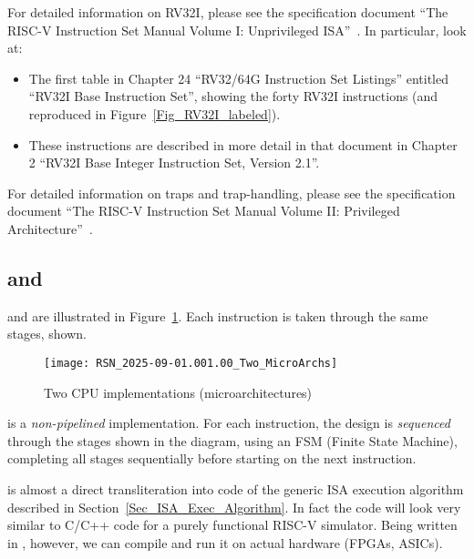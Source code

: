 For detailed information on RV32I, please see the specification
document ``The RISC-V Instruction Set Manual Volume I: Unprivileged
ISA''~\cite{RISCV_Unpriv_2019_12_13}.  In particular, look at:

\begin{itemize}

 \item The first table in Chapter 24 ``RV32/64G Instruction Set
       Listings'' entitled ``RV32I Base Instruction Set'', showing the
       forty RV32I instructions (and reproduced in
       Figure~\ref{Fig_RV32I_labeled}).

 \item These instructions are described in more detail in that
       document in Chapter 2 ``RV32I Base Integer Instruction Set,
       Version 2.1''.

\end{itemize}

For detailed information on traps and trap-handling, please see the
specification document ``The RISC-V Instruction Set Manual Volume II:
Privileged Architecture''~\cite{RISCV_Priv_2021_12_03}.


\subsection{{\DRUM} and {\FIFE}}

{\DRUM} and {\FIFE} are illustrated in
Figure~\ref{Fig_Two_Microarchitectures}.  Each instruction is taken
through the same stages, shown.
\begin{figure}[htbp]
  \centerline{\texttt{[image: RSN\_2025-09-01.001.00\_Two\_MicroArchs]}}
  \caption{\label{Fig_Two_Microarchitectures}Two CPU implementations (microarchitectures)}
\end{figure}

{\DRUM} is a \emph{non-pipelined} implementation.  For each instruction,
the design is \emph{sequenced} through the stages shown in the
diagram, using an FSM (Finite State Machine), completing all stages
sequentially before starting on the next instruction.

{\DRUM} is almost a direct transliteration into {\BSV} code of the generic
ISA execution algorithm described in
Section~\ref{Sec_ISA_Exec_Algorithm}.  In fact the {\BSV} code will look
very similar to C/C++ code for a purely functional RISC-V simulator.
Being written in {\BSV}, however, we can compile and run it on actual
hardware (FPGAs, ASICs).
       
